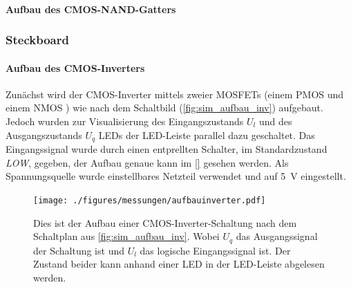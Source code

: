 \documentclass[12pt,english,ngerman]{scrartcl}
\begin{document}


\paragraph{Aufbau des CMOS-NAND-Gatters}

\begin{figure}[H]
  \centering
  \caption{}
  \label{fig:sim_aufbau_nand}
\end{figure}



\subsubsection{Steckboard}
\paragraph{Aufbau des CMOS-Inverters}\label{sec:mess_cmos}
Zunächst wird der CMOS-Inverter mittels zweier MOSFETs (einem PMOS \cite{} und
einem NMOS \cite{}) wie nach dem Schaltbild (\autoref{fig:sim_aufbau_inv})
aufgebaut. Jedoch wurden zur Visualisierung des Eingangszustands $U_l$ und des
Ausgangszustands $U_q$ LEDs der LED-Leiste parallel dazu geschaltet. Das
Eingangssignal wurde durch einen entprellten Schalter, im Standardzustand
\textit{LOW}, gegeben, der Aufbau genaue kann im \autoref{} gesehen werden. Als
Spannungsquelle wurde einstellbares Netzteil verwendet und auf \SI{5}{\volt}
eingestellt. 

\begin{figure}[H]
  \centering
    \texttt{[image: ./figures/messungen/aufbauinverter.pdf]}
  \caption{Dies ist der Aufbau einer CMOS-Inverter-Schaltung nach dem
  Schaltplan aus \autoref{fig:sim_aufbau_inv}. Wobei $U_q$ das Ausgangssignal
  der Schaltung ist  und $U_l$ das logische Eingangssignal ist. Der Zustand
  beider kann anhand einer LED in der LED-Leiste abgelesen werden.}
  \label{fig:mess_aufbau_inv}
\end{figure}
\end{document}
